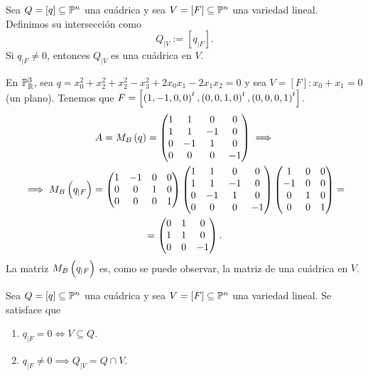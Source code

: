 \begin{defi}
  Sea $Q= \left[ q \right] \subseteq \mathbb{P} ^n$ una cuádrica y sea $V = \left[ F \right] \subseteq \mathbb{P} ^n$ una variedad lineal. Definimos su intersección como
  \[
    Q_{|V} := \left[q_{|F} \right].
  \]
  Si $q_{|F} \neq 0$, entonces $Q_{|V}$ es una cuádrica en $V$.
\end{defi}

\begin{example}
  En $\mathbb{P} _{\mathbb{R}} ^3$, sea $q=x_0^2+x_2^2+x_2^2-x_3^2+2x_0x_1-2x_1x_2=0$ y sea $V=\left[ F \right] \colon x_0+x_1=0$ (un plano). Tenemos que $F=\left[ \left( 1, -1, 0, 0 \right) ^t, \left( 0, 0, 1, 0 \right) ^t, \left( 0, 0, 0, 1 \right) ^t \right]$.
  \begin{gather*}
    A=M_B\left( q \right) = \begin{pmatrix}
      1 & 1 & 0 & 0 \\
      1 & 1 & -1 & 0 \\
      0 & -1 & 1 & 0 \\
      0 & 0 & 0 & -1
    \end{pmatrix} \implies \\
    \implies M_B \left( q_{|F} \right) = \begin{pmatrix}
      1 & -1 & 0 & 0 \\
      0 & 0 & 1 & 0 \\
      0 & 0 & 0 & 1
    \end{pmatrix} \begin{pmatrix}
      1 & 1 & 0 & 0 \\
      1 & 1 & -1 & 0 \\
      0 & -1 & 1 & 0 \\
      0 & 0 & 0 & -1
    \end{pmatrix} \begin{pmatrix}
      1 & 0 & 0 \\
      -1 & 0 & 0 \\
      0 & 1 & 0 \\
      0 & 0 & 1
    \end{pmatrix} = \\
    = \begin{pmatrix}
      0 & 1 & 0 \\
      1 & 1 & 0 \\
      0 & 0 & -1
    \end{pmatrix}.
  \end{gather*}
  La matriz $M_B \left( q_{|F} \right)$ es, como se puede observar, la matriz de una cuádrica en $V$.
\end{example}
\begin{prop}
  Sea $Q= \left[ q \right] \subseteq \mathbb{P} ^n$ una cuádrica y sea $V = \left[ F \right] \subseteq \mathbb{P} ^n$ una variedad lineal. Se satisface que
  \begin{enumerate}[(1)]
    \item $q_{|F} = 0 \iff V \subseteq Q$.
    \item $q_{|F} \neq 0 \implies Q_{|V} = Q \cap V $.
  \end{enumerate}
\end{prop}

